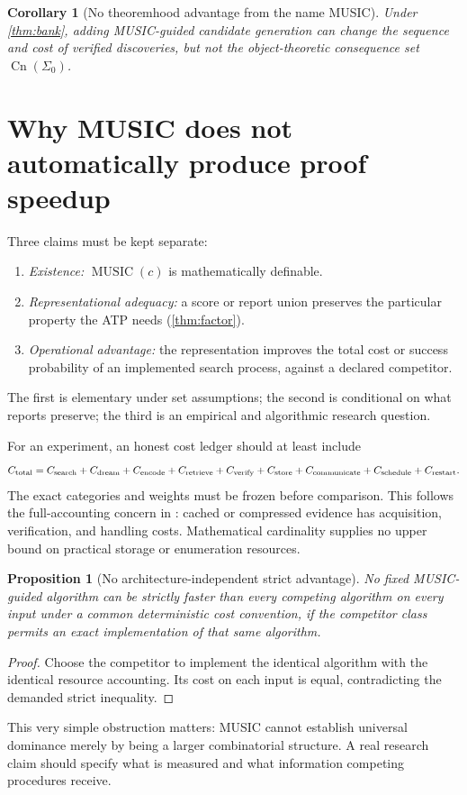 \documentclass[11pt,letterpaper]{article}
\newtheorem{proposition}[theorem]{Proposition}
\newtheorem{corollary}[theorem]{Corollary}
\theoremstyle{definition}
\theoremstyle{remark}
\newcommand{\Music}{\operatorname{MUSIC}}
\newcommand{\Cn}{\operatorname{Cn}}
\begin{document}
\begin{corollary}[No theoremhood advantage from the name MUSIC]
Under \cref{thm:bank}, adding MUSIC-guided candidate generation can change the sequence and cost of verified discoveries, but not the object-theoretic consequence set $\Cn(\Sigma_0)$.
\end{corollary}

\section{Why MUSIC does not automatically produce proof speedup}
Three claims must be kept separate:
\begin{enumerate}
\item \emph{Existence:} $\Music(c)$ is mathematically definable.
\item \emph{Representational adequacy:} a score or report union preserves the particular property the ATP needs (\cref{thm:factor}).
\item \emph{Operational advantage:} the representation improves the total cost or success probability of an implemented search process, against a declared competitor.
\end{enumerate}
The first is elementary under set assumptions; the second is conditional on what reports preserve; the third is an empirical and algorithmic research question.

For an experiment, an honest cost ledger should at least include
\begin{equation}\label{eq:cost}
 C_{\rm total}=C_{\rm search}+C_{\rm dream}+C_{\rm encode}
 +C_{\rm retrieve}+C_{\rm verify}+C_{\rm store}
 +C_{\rm communicate}+C_{\rm schedule}+C_{\rm restart}.
\end{equation}
The exact categories and weights must be frozen before comparison. This follows the full-accounting concern in \cite{tenneson-wcf}: cached or compressed evidence has acquisition, verification, and handling costs. Mathematical cardinality supplies no upper bound on practical storage or enumeration resources.

\begin{proposition}[No architecture-independent strict advantage]\label{prop:noall}
No fixed MUSIC-guided algorithm can be strictly faster than \emph{every} competing algorithm on every input under a common deterministic cost convention, if the competitor class permits an exact implementation of that same algorithm.
\end{proposition}
\begin{proof}
Choose the competitor to implement the identical algorithm with the identical resource accounting. Its cost on each input is equal, contradicting the demanded strict inequality.
\end{proof}
This very simple obstruction matters: MUSIC cannot establish universal dominance merely by being a larger combinatorial structure. A real research claim should specify what is measured and what information competing procedures receive.
\end{document}
